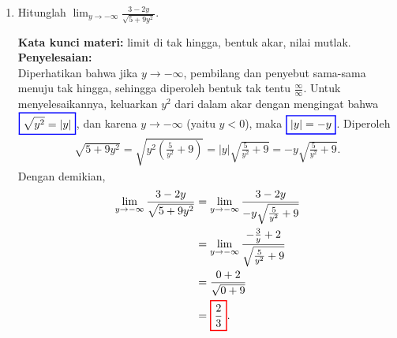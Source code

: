 \documentclass[10pt,openany,a4paper]{article}
\theoremstyle{definition}
\theoremstyle{definition}
\theoremstyle{plain}
\newenvironment{jawab}[2][tes]{%
\par\noindent\textbf{Kata kunci materi:} #1.\\
\textbf{Penyelesaian:} #2%
}{}
\begin{document}
\begin{enumerate}
    \item Hitunglah $\displaystyle\lim_{y\to-\infty}\frac{3-2y}{\sqrt{5+9y^2}}$.
    \begin{jawab}[limit di tak hingga, bentuk akar, nilai mutlak]{~\\
        Diperhatikan bahwa jika $y\to-\infty$, pembilang dan penyebut sama-sama menuju tak hingga, sehingga diperoleh bentuk tak tentu $\frac{\infty}{\infty}$. Untuk menyelesaikannya, keluarkan $y^2$ dari dalam akar dengan mengingat bahwa $\colorlet{oldcolor}{.}
        \color{blue}
        \setlength{\fboxrule}{1pt} \boxed{\color{oldcolor}\sqrt{y^2}=|y|}\color{oldcolor}$, dan karena $y\to-\infty$ (yaitu $y<0$), maka $\colorlet{oldcolor}{.}
        \color{blue}
        \setlength{\fboxrule}{1pt} \boxed{\color{oldcolor}|y|=-y}\color{oldcolor}$. Diperoleh
        \begin{align*}
            \sqrt{5+9y^2} = \sqrt{y^2\left(\frac{5}{y^2}+9\right)} = |y|\sqrt{\frac{5}{y^2}+9} = -y\sqrt{\frac{5}{y^2}+9}.
        \end{align*}
        Dengan demikian,
        \begin{align*}
            \lim_{y\to-\infty}\frac{3-2y}{\sqrt{5+9y^2}} &= \lim_{y\to-\infty}\frac{3-2y}{-y\sqrt{\frac{5}{y^2}+9}}\\
            &= \lim_{y\to-\infty}\frac{-\frac{3}{y}+2}{\sqrt{\frac{5}{y^2}+9}}\\
            &= \frac{0+2}{\sqrt{0+9}}\\
            &= \colorlet{oldcolor}{.}
        \color{red}
        \setlength{\fboxrule}{1pt} \boxed{\color{oldcolor}\frac{2}{3}}\color{oldcolor}.
        \end{align*}
    }
    \end{jawab}


\end{enumerate}
\end{document}
